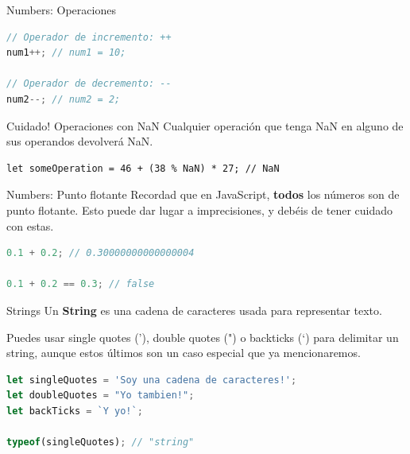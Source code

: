 \documentclass{beamer}
\begin{document}
\begin{frame}[fragile]{Numbers: Operaciones}
\begin{lstlisting}[language=JavaScript]
// Operador de incremento: ++
num1++; // num1 = 10;

// Operador de decremento: --
num2--; // num2 = 2;
\end{lstlisting}\pause

\begin{block}{Cuidado! Operaciones con NaN}
Cualquier operación que tenga NaN en alguno de sus operandos devolverá NaN. 
\begin{lstlisting}
let someOperation = 46 + (38 % NaN) * 27; // NaN
\end{lstlisting}
\end{block}
\end{frame}

\begin{frame}[fragile]{Numbers: Punto flotante}
Recordad que en JavaScript, \textbf{todos} los números son de punto flotante. Esto puede dar lugar a imprecisiones, y debéis de tener cuidado con estas.

\begin{lstlisting}[language=JavaScript]
0.1 + 0.2; // 0.30000000000000004

0.1 + 0.2 == 0.3; // false
\end{lstlisting}
\end{frame}

\begin{frame}[fragile]{Strings}
Un \textbf{String} es una cadena de caracteres usada para representar texto.

Puedes usar single quotes ('), double quotes (") o backticks (`) para delimitar un string, aunque estos últimos son un caso especial que ya mencionaremos.\pause

\begin{lstlisting}[language=JavaScript]
let singleQuotes = 'Soy una cadena de caracteres!';
let doubleQuotes = "Yo tambien!";
let backTicks = `Y yo!`;

typeof(singleQuotes); // "string"
\end{lstlisting}
\end{frame}
\end{document}
